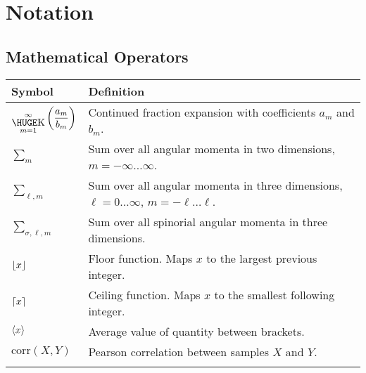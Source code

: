 \chapter*{Notation}


\section*{Mathematical Operators}
\begin{tabularx}{\textwidth}{lX}
  \hline\hline
  Symbol				& Definition	\\
  \hline\hline				
  $\displaystyle{\bigk_{m=1}^\infty\left(\frac{a_m}{b_m}\right)}$
						& Continued fraction expansion with coefficients $a_m$ and $b_m$. \\
  ${\sum_m}$			& Sum over all angular momenta in two dimensions, $m=-\infty\ldots\infty$.\\
  ${\sum_{\ell,m}}$		& Sum over all angular momenta in three dimensions, $\ell=0\ldots\infty$, $m=-\ell\ldots\ell$. \\
  ${\sum_{\sigma,\ell,m}}$	& Sum over all spinorial angular momenta in three dimensions.	\\
  $\floor*{x}$			& Floor function. Maps $x$ to the largest previous integer.	\\
  $\ceil*{x}$			& Ceiling function. Maps $x$ to the smallest following integer.	\\
  $\avg{x}$				& Average value of quantity between brackets.			\\
  $\text{corr}(X,Y)$	& Pearson correlation between samples $X$ and $Y$.	\\
  \hline\hline				\\
\end{tabularx}

